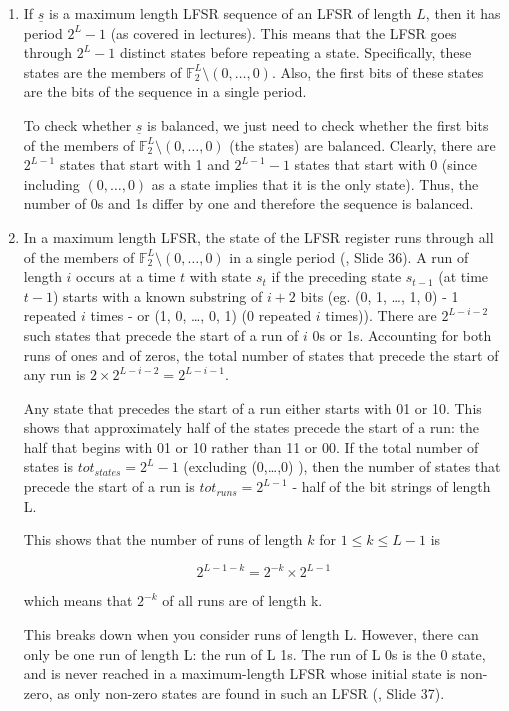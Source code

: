 \begin{enumerate}

\item If $\underline{s}$ is a maximum length LFSR sequence of an LFSR of length
$L$, then it has period $2^L-1$ (as covered in lectures). This means that the
LFSR goes through $2^L-1$ distinct states before repeating a state.
Specifically, these states are the members of $\mathbb{F}_2^L \setminus
(0,\dots,0)$. Also, the first bits of these states are the bits of the sequence
in a single period.

To check whether $\underline{s}$ is balanced, we just need to check whether the
first bits of the members of $\mathbb{F}_2^L \setminus (0,\dots,0)$ (the states)
are balanced. Clearly, there are $2^{L-1}$ states that start with 1 and
$2^{L-1}-1$ states that start with 0 (since including $(0,\dots,0)$ as a state
implies that it is the only state). Thus, the number of 0s and 1s differ by one
and therefore the sequence is balanced.

\item In a maximum length LFSR, the state of the LFSR register runs through all
of the members of $\mathbb{F}_2^L \setminus (0,\dots,0)$ in a single period
(\cite{slides}, Slide 36). A run of length $i$ occurs at a time $t$ with state
$s_t$ if the preceding state $s_{t-1}$ (at time $t-1$) starts with a known
substring of $i+2$ bits (eg. (0, 1, \dots, 1, 0) - 1 repeated $i$ times - or (1,
0, \dots, 0, 1) (0 repeated $i$ times)). There are $2^{L-i-2}$ such states that
precede the start of a run of $i$ 0s or 1s. Accounting for both runs of ones and
of zeros, the total number of states that precede the start of any run is $2
\times 2^{L-i-2} = 2^{L-i-1}$.

Any state that precedes the start of a run either starts with 01 or 10. This
shows that approximately half of the states precede the start of a run: the half
that begins with 01 or 10 rather than 11 or 00. If the total number of states is
$tot_{states} = 2^L-1$ (excluding (0,\dots,0) ), then the number of states that
precede the start of a run is $tot_{runs} = 2^{L-1}$ - half of the bit strings
of length L.

This shows that the number of runs of length $k$ for $1 \le k \le L-1$ is

\[2^{L-1-k} = 2^{-k} \times 2^{L-1}\]

which means that $2^{-k}$ of all runs are of length k.

This breaks down when you consider runs of length L. However, there can only be
one run of length L: the run of L 1s. The run of L 0s is the 0 state, and is
never reached in a maximum-length LFSR whose initial state is non-zero, as only
non-zero states are found in such an LFSR (\cite{slides}, Slide 37).

\end{enumerate}
